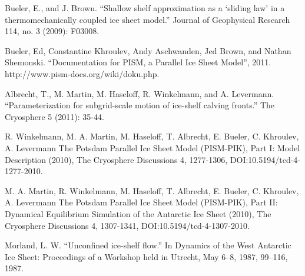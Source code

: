 \documentclass[a4paper,10pt]{article}
\begin{document}
\begin{thebibliography}{9}

 Bueler, E., and J. Brown. “Shallow shelf approximation as a ‘sliding law’ in a thermomechanically coupled ice sheet model.” Journal of Geophysical Research 114, no. 3 (2009): F03008.

Bueler, Ed, Constantine Khroulev, Andy Aschwanden, Jed Brown, and Nathan Shemonski. “Documentation for PISM, a Parallel Ice Sheet Model”, 2011. http://www.pism-docs.org/wiki/doku.php.

 Albrecht, T., M. Martin, M. Haseloff, R. Winkelmann, and A. Levermann. “Parameterization for subgrid-scale motion of ice-shelf calving fronts.” The Cryosphere 5 (2011): 35-44.

 R. Winkelmann, M. A. Martin, M. Haseloff, T. Albrecht, E. Bueler, C. Khroulev, A. Levermann
The Potsdam Parallel Ice Sheet Model (PISM-PIK), Part I: Model Description
(2010), The Cryosphere Discussions 4, 1277-1306, DOI:10.5194/tcd-4-1277-2010.
	 
 M. A. Martin, R. Winkelmann, M. Haseloff, T. Albrecht, E. Bueler, C. Khroulev, A. Levermann
The Potsdam Parallel Ice Sheet Model (PISM-PIK), Part II: Dynamical Equilibrium Simulation of the Antarctic Ice Sheet
(2010), The Cryosphere Discussions 4, 1307-1341, DOI:10.5194/tcd-4-1307-2010.

 Morland, L. W. “Unconfined ice-shelf flow.” In Dynamics of the West Antarctic Ice Sheet: Proceedings of a Workshop held in Utrecht, May 6–8, 1987, 99–116, 1987.




\end{thebibliography}
\end{document}
